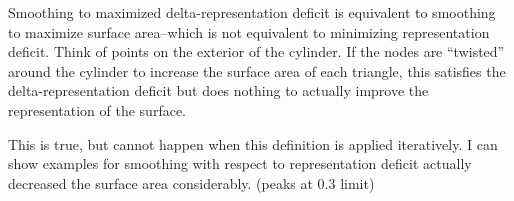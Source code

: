 Smoothing to maximized delta-representation deficit is equivalent to smoothing to maximize surface area--which is not equivalent to minimizing representation deficit. Think of points on the exterior of the cylinder. If the nodes are ``twisted'' around the cylinder to increase the surface area of each triangle, this satisfies the delta-representation deficit but does nothing to actually improve the representation of the surface.

This is true, but cannot happen when this definition is applied iteratively. I can show examples for smoothing with respect to representation deficit actually decreased the surface area considerably. (peaks at 0.3 limit)

